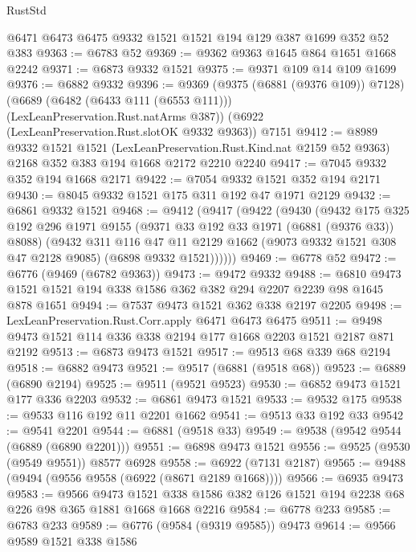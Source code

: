 \begin{lexlean}{RustStd}
\begin{coremodule}
    @6471
    @6473
    @6475
    @9332
    @1521
    @1521
    @194
    @129
    @387
    @1699
    @352
    @52
    @383
@9363 := @6783 @52
@9369 := @9362 @9363 @1645 @864 @1651 @1668 @2242
@9371 := @6873 @9332 @1521
@9375 := @9371 @109 @14 @109 @1699
@9376 := @6882 @9332
@9396 := @9369
    (@9375 (@6881 (@9376 @109)) @7128)
    (@6689 (@6482 (@6433 @111 (@6553 @111))) (LexLeanPreservation.Rust.natArms @387))
    (@6922 (LexLeanPreservation.Rust.slotOK @9332 @9363))
    @7151
@9412 := @8989
    @9332
    @1521
    @1521
    (LexLeanPreservation.Rust.Kind.nat @2159 @52 @9363)
    @2168
    @352
    @383
    @194
    @1668
    @2172
    @2210
    @2240
@9417 := @7045 @9332 @352 @194 @1668 @2171
@9422 := @7054 @9332 @1521 @352 @194 @2171
@9430 := @8045 @9332 @1521 @175 @311 @192 @47 @1971 @2129
@9432 := @6861 @9332 @1521
@9468 := @9412
    (@9417
      (@9422
        (@9430
          (@9432
            @175
            @325
            @192
            @296
            @1971
            @9155
            (@9371 @33 @192 @33 @1971 (@6881 (@9376 @33)) @8088)
            (@9432
              @311
              @116
              @47
              @11
              @2129
              @1662
              (@9073 @9332 @1521 @308 @47 @2128 @9085)
              (@6898 @9332 @1521))))))
@9469 := @6778 @52
@9472 := @6776 (@9469 (@6782 @9363))
@9473 := @9472 @9332
@9488 := @6810 @9473 @1521 @1521 @194 @338 @1586 @362 @382 @294 @2207 @2239 @98 @1645 @878 @1651
@9494 := @7537 @9473 @1521 @362 @338 @2197 @2205
@9498 := LexLeanPreservation.Rust.Corr.apply @6471 @6473 @6475
@9511 := @9498 @9473 @1521 @114 @336 @338 @2194 @177 @1668 @2203 @1521 @2187 @871 @2192
@9513 := @6873 @9473 @1521
@9517 := @9513 @68 @339 @68 @2194
@9518 := @6882 @9473
@9521 := @9517 (@6881 (@9518 @68))
@9523 := @6889 (@6890 @2194)
@9525 := @9511 (@9521 @9523)
@9530 := @6852 @9473 @1521 @177 @336 @2203
@9532 := @6861 @9473 @1521
@9533 := @9532 @175
@9538 := @9533 @116 @192 @11 @2201 @1662
@9541 := @9513 @33 @192 @33
@9542 := @9541 @2201
@9544 := @6881 (@9518 @33)
@9549 := @9538 (@9542 @9544 (@6889 (@6890 @2201)))
@9551 := @6898 @9473 @1521
@9556 := @9525 (@9530 (@9549 @9551)) @8577 @6928
@9558 := @6922 (@7131 @2187)
@9565 := @9488 (@9494 (@9556 @9558 (@6922 (@8671 @2189 @1668))))
@9566 := @6935 @9473
@9583 := @9566
    @9473
    @1521
    @338
    @1586
    @382
    @126
    @1521
    @194
    @2238
    @68
    @226
    @98
    @365
    @1881
    @1668
    @1668
    @2216
@9584 := @6778 @233
@9585 := @6783 @233
@9589 := @6776 (@9584 (@9319 @9585)) @9473
@9614 := @9566
    @9589
    @1521
    @338
    @1586

\end{coremodule}
\end{lexlean}
